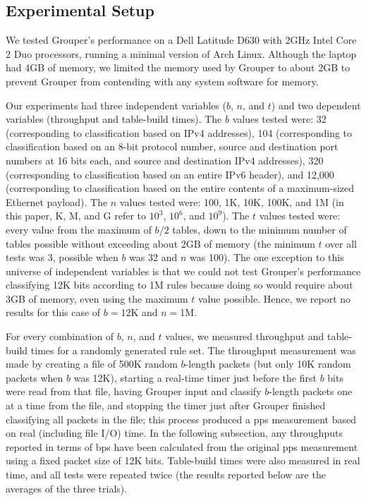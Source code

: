 \documentclass[10pt, conference, compsocconf]{IEEEtran}
\begin{document}
\subsection{Experimental Setup}

We tested Grouper's performance on a Dell Latitude D630 with 2GHz Intel Core 2
Duo processors, running a minimal version of Arch Linux.  Although the laptop
had 4GB of memory, we limited the memory used by Grouper to about 2GB to prevent
Grouper from contending with any system software for memory.

Our experiments had three independent variables ($b$, $n$, and $t$) and two
dependent variables (throughput and table-build times).  The $b$ values tested
were: 32 (corresponding to classification based on IPv4 addresses), 104
(corresponding to classification based on an 8-bit protocol number, source and
destination port numbers at 16 bits each, and source and destination IPv4
addresses), 320 (corresponding to classification based on an entire IPv6
header), and 12,000 (corresponding to classification based on the entire
contents of a maximum-sized Ethernet payload).  The $n$ values tested were: 100,
1K, 10K, 100K, and 1M (in this paper, K, M, and G refer to $10^3$, $10^6$, and
$10^9$).  The $t$ values tested were: every value from the maximum of $b/2$
tables, down to the minimum number of tables possible without exceeding about
2GB of memory (the minimum $t$ over all tests was 3, possible when $b$ was 32
and $n$ was 100).  The one exception to this universe of independent variables
is that we could not test Grouper's performance classifying 12K bits according
to 1M rules because doing so would require about 3GB of memory, even using the
maximum $t$ value possible.  Hence, we report no results for this case of
$b{=}$12K and $n{=}$1M.

For every combination of $b$, $n$, and $t$ values, we measured throughput and
table-build times for a randomly generated rule set.  The throughput measurement
was made by creating a file of 500K random $b$-length packets (but only 10K
random packets when $b$ was 12K), starting a real-time timer just before the
first $b$ bits were read from that file, having Grouper input and classify
$b$-length packets one at a time from the file, and stopping the timer just
after Grouper finished classifying all packets in the file; this process
produced a pps measurement based on real (including file I/O) time.  In the
following subsection, any throughputs reported in terms of bps have been
calculated from the original pps measurement using a fixed packet size of 12K
bits.  Table-build times were also measured in real time, and all tests were
repeated twice (the results reported below are the averages of the three
trials).
\end{document}
